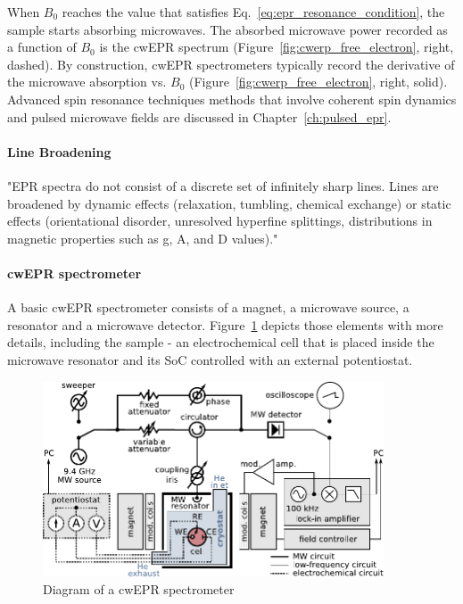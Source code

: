 \par
When $B_0$ reaches the value that satisfies Eq.~\ref{eq:epr_resonance_condition}, the sample starts absorbing microwaves. The absorbed microwave power recorded as a function of $B_0$ is the cwEPR spectrum (Figure~\ref{fig:cwerp_free_electron}, right, dashed). By construction, cwEPR spectrometers typically record the derivative of the microwave absorption vs. $B_0$ (Figure~\ref{fig:cwerp_free_electron}, right, solid). Advanced spin resonance techniques methods that involve coherent spin dynamics and pulsed microwave fields are discussed in Chapter~\ref{ch:pulsed_epr}.

\paragraph{Line Broadening}
"EPR spectra do not consist of a discrete set of infinitely sharp lines. Lines are broadened by dynamic effects (relaxation, tumbling, chemical exchange) or static effects (orientational disorder, unresolved hyperfine splittings, distributions in magnetic properties such as g, A, and D values)."


\paragraph{cwEPR spectrometer}

A basic cwEPR spectrometer consists of a magnet, a microwave source, a resonator and a microwave detector. Figure~\ref{fig:cwerp_spectrometer} depicts those elements with more details, including the sample - an electrochemical cell that is placed inside the microwave resonator and its SoC controlled with an external potentiostat.

\begin{figure}[h]
\center
	\includegraphics[width=0.9\textwidth]{./operando_epr/figures/cwEPR_spectrometer_diagram.pdf}
	\caption{Diagram of a cwEPR spectrometer}
	\label{fig:cwerp_spectrometer}
\end{figure}

